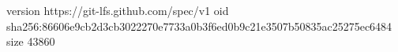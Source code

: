 version https://git-lfs.github.com/spec/v1
oid sha256:86606e9cb2d3cb3022270e7733a0b3f6ed0b9c21e3507b50835ac25275ec6484
size 43860

